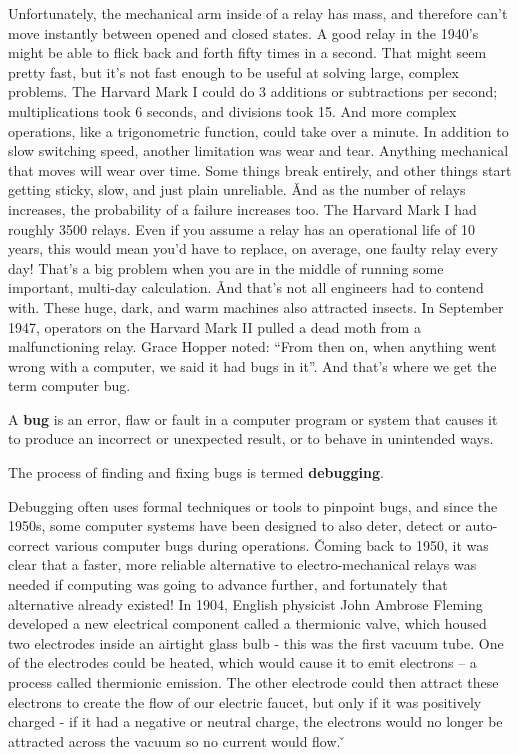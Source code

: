 Unfortunately, the mechanical arm inside of a relay has mass, and therefore can't move instantly between opened and
closed states. A good relay in the 1940's might be able to flick back and forth fifty times in a second. That might
seem pretty fast, but it's not fast enough to be useful at solving large, complex problems. The Harvard Mark I could
do 3 additions or subtractions per second; multiplications took 6 seconds, and divisions took 15. And more complex
operations, like a trigonometric function, could take over a minute. In addition to slow switching speed, another
limitation was wear and tear. Anything mechanical that moves will wear over time. Some things break entirely, and
other things start getting sticky, slow, and just plain unreliable. \v

And as the number of relays increases, the probability of a failure increases too. The Harvard Mark I had roughly
3500 relays. Even if you assume a relay has an operational life of 10 years, this would mean you'd have to replace,
on average, one faulty relay every day! That's a big problem when you are in the middle of running some important,
multi-day calculation. \v

And that's not all engineers had to contend with. These huge, dark, and warm machines also attracted insects. In
September 1947, operators on the Harvard Mark II pulled a dead moth from a malfunctioning relay. Grace Hopper noted:
``From then on, when anything went wrong with a computer, we said it had bugs in it''. And that's where we get the term
computer bug.

\bd[Bug]
A \textbf{bug} is an error, flaw or fault in a computer program or system that causes it to produce an incorrect or
unexpected result, or to behave in unintended ways.
\ed

\bd[Debugging]
The process of finding and fixing bugs is termed \textbf{debugging}.
\ed

Debugging often uses formal techniques or tools to pinpoint bugs, and since the 1950s, some computer systems have
been designed to also deter, detect or auto-correct various computer bugs during operations. \v

Coming back to 1950, it was clear that a faster, more reliable alternative to electro-mechanical relays was needed if
computing was going to advance further, and fortunately that alternative already existed! In 1904, English physicist
John Ambrose Fleming developed a new electrical component called a thermionic valve, which housed two electrodes
inside an airtight glass bulb - this was the first vacuum tube. One of the electrodes could be heated, which would
cause it to emit electrons – a process called thermionic emission. The other electrode could then attract these
electrons to create the flow of our electric faucet, but only if it was positively charged - if it had a negative or
neutral charge, the electrons would no longer be attracted across the vacuum so no current would flow. \v

